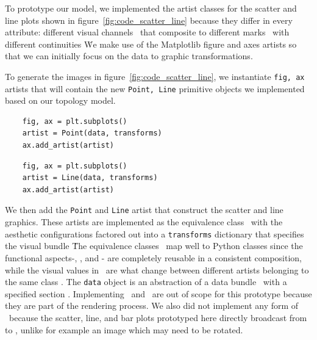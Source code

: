 \documentclass[../main.tex]{subfiles}
\begin{document}
To prototype our model, we implemented the artist classes for the scatter and line plots shown in figure~\ref{fig:code_scatter_line} because they differ in every attribute: different visual channels \vchannel\ that composite to different marks \vmark\ with different continuities \vindex\.  We make use of the Matplotlib figure and axes artists \cite{hunterArchitectureOpenSource,hunterMatplotlib2DGraphics2007} so that we can initially focus on the data to graphic transformations. 

To generate the images in figure~\ref{fig:code_scatter_line}, we instantiate \texttt{fig, ax} artists that will contain the new \texttt{Point, Line} primitive objects we implemented based on our topology model. 

\begin{multicols*}{2}
\begin{verbatim}
    fig, ax = plt.subplots()
    artist = Point(data, transforms)
    ax.add_artist(artist)
\end{verbatim}
\columnbreak
\begin{verbatim}
    fig, ax = plt.subplots()
    artist = Line(data, transforms)
    ax.add_artist(artist)
\end{verbatim}
\end{multicols*}

We then add the \texttt{Point} and \texttt{Line} artist that construct the scatter and line graphics. These artists are implemented as the equivalence class \vartisteq\ with the aesthetic configurations factored out into a \texttt{transforms} dictionary that specifies the visual bundle \vtotal\. The equivalence classes \vartisteq\ map well to Python classes since the functional aspects-\vchannel, \vmarkd, and \vindex - are completely reusable in a consistent composition, while the visual values in \vtotal\ are what change between different artists belonging to the same class \vartisteq. The \texttt{data} object is an abstraction of a data bundle \dtotal\ with a specified section \tau. Implementing \gtotal\ and \gsection\ are out of scope for this prototype because they are part of the rendering process. We also did not implement any form of \vindex\ because the scatter, line, and bar plots prototyped here directly broadcast from \dbasepoint to \gbasepoint, unlike for example an image which may need to be rotated. 
 
\end{document}
